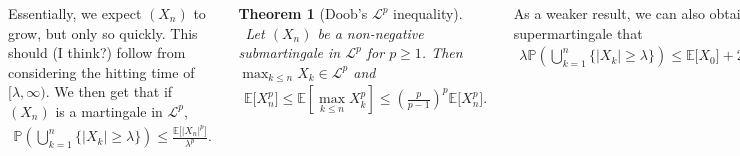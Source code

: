 \documentclass{tikzposter} %
\newcommand\rightopen[2]{\ensuremath{[#1,#2)}}
\newtheorem{theorem}{Theorem}
\newtheorem{definition}{Definition}
\begin{document}
\begin{columns}
{    Essentially, we expect $(X_{n})$ to grow, but only so quickly. This should (I think?) follow from considering the hitting time of $\rightopen{\lambda}{\infty}$. We then get that if $(X_{n})$ is a martingale in $\mathcal{L}^{p}$,
    \begin{align*}
      \mathbb{P}\left(\bigcup_{k = 1}^{n} \{|X_{k}| \ge \lambda \}\right) \le \frac{\mathbb{E}\big[|X_{n}|^{p}\big]}{\lambda^{p}}.
    \end{align*}
    \begin{theorem}[Doob's $\mathcal{L}^{p}$ inequality]
      \ Let $(X_{n})$ be a non-negative submartingale in $\mathcal{L}^{p}$ for $p \ge 1$. Then $\displaystyle \max_{k \le n} X_{k} \in \mathcal{L}^{p}$ and
      \begin{align*}
        \mathbb{E}\big[X^{p}_{n}\big] \le \mathbb{E}\left[\max_{k \le n} X_{k}^{p}\right] \le \left(\frac{p}{p-1}\right)^{p}\mathbb{E}\big[X^{p}_{n}\big].
      \end{align*}
    \end{theorem}
    \hphantom{}

    As a weaker result, we can also obtain for a supermartingale that
    \begin{align*}
      \lambda \mathbb{P}\left(\bigcup_{k=1}^{n} \{|X_{k}| \ge \lambda\}\right) \le \mathbb{E}\big[X_{0}\big] + 2\mathbb{E}\big[X^{-}_{n}\big].
    \end{align*}
    \hphantom{}
  }
\end{columns}
\end{document}
